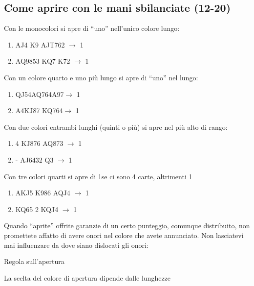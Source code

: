 \documentclass[../corsofiori.tex]{subfiles}
\begin{document}
\subsection{
Come aprire con le mani sbilanciate (12-20)
}
Con le monocolori si apre di “uno” nell’unico colore lungo:

\begin{enumerate}[label={}]
\item {} {AJ4} {K9} {AJT762} $\rightarrow$ 1\Cl

\item {} {AQ9853} {KQ7} {K72} $\rightarrow$ 1\He
\end{enumerate}

Con un colore quarto e uno più lungo si apre di “uno” nel lungo:

\begin{enumerate}[label={}]
\item {} {QJ54}{AQ764}{A97}$\rightarrow$ 1\Di

\item {} {A4}{KJ87} {KQ764}$\rightarrow$ 1\Cl
\end{enumerate}




Con due colori entrambi lunghi (quinti o più) si apre nel più alto di rango:

\begin{enumerate}[label={}]
\item {} {4} {KJ876} {AQ873} $\rightarrow$ 1\Di



\item {} {-} {AJ6432} {Q3} $\rightarrow$ 1\Sp

\end{enumerate}
Con tre colori quarti si apre di 1\Di se ci sono 4 carte, altrimenti 1\Cl

\begin{enumerate}[label={}]
\item {} {AKJ5} {K986} {AQJ4} $\rightarrow$ 1\Di

\item {} {KQ65} {2} {KQJ4} $\rightarrow$ 1\Cl
\end{enumerate}

Quando “aprite” offrite garanzie di un certo punteggio, comunque distribuito, non promettete affatto di avere onori nel
colore che avete annunciato. Non lasciatevi
mai influenzare da dove siano dislocati gli onori:
\begin{regola}{Regola sull'apertura}
    
La scelta del colore di apertura dipende dalle lunghezze
\end{regola}
\end{document}
